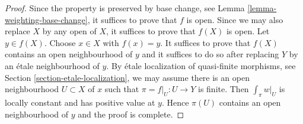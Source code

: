 \documentclass[10pt,a4paper]{amsart}
\theoremstyle{plain}
\theoremstyle{definition}
\theoremstyle{remark}
\numberwithin{equation}{subsection}
\begin{document}
\begin{proof}
Since the property is preserved by base change, see
Lemma \ref{lemma-weighting-base-change}, it suffices
to prove that $f$ is open. Since we may also replace
$X$ by any open of $X$, it suffices to prove that $f(X)$
is open. Let $y \in f(X)$. Choose $x \in X$ with $f(x) = y$.
It suffices to prove that $f(X)$ contains an open neighbourhood
of $y$ and it suffices to do so after replacing $Y$ by an
\'etale neighbourhood of $y$. By \'etale localization of
quasi-finite morphisms, see Section \ref{section-etale-localization},
we may assume
there is an open neighbourhood $U \subset X$ of $x$
such that $\pi = f|_U : U \to Y$ is finite. Then
$\int_\pi w|_U$ is locally constant and has positive value at $y$.
Hence $\pi(U)$ contains an open neighbourhood of $y$
and the proof is complete.
\end{proof}
\end{document}
